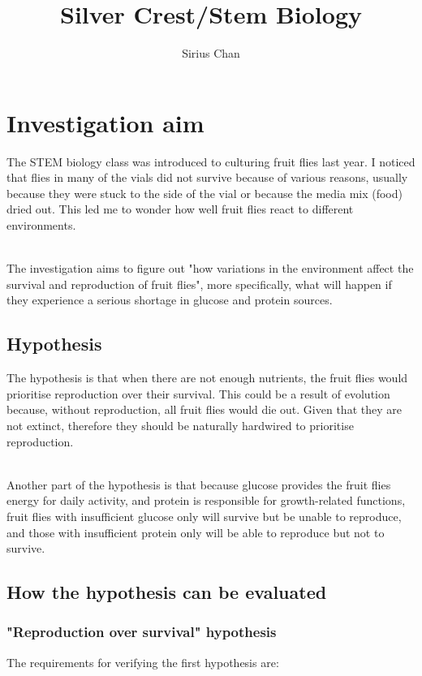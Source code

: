 \documentclass{article}
\title{Silver Crest/Stem Biology}
\author{Sirius Chan}
\begin{document}
\maketitle

\newpage

\section{Investigation aim}

The STEM biology class was introduced to culturing fruit flies last year. I noticed that flies in many of the vials did not survive because of various reasons, usually because they were stuck to the side of the vial or because the media mix (food) dried out. This led me to wonder how well fruit flies react to different environments.

\noindent\\
The investigation aims to figure out "how variations in the environment affect the survival and reproduction of fruit flies", more specifically, what will happen if they experience a serious shortage in glucose and protein sources.

\subsection{Hypothesis}

The hypothesis is that when there are not enough nutrients, the fruit flies would prioritise reproduction over their survival. This could be a result of evolution because, without reproduction, all fruit flies would die out. Given that they are not extinct, therefore they should be naturally hardwired to prioritise reproduction.

\noindent\\
Another part of the hypothesis is that because glucose provides the fruit flies energy for daily activity, and protein is responsible for growth-related functions, fruit flies with insufficient glucose only will survive but be unable to reproduce, and those with insufficient protein only will be able to reproduce but not to survive.

\subsection{How the hypothesis can be evaluated}

\subsubsection{"Reproduction over survival" hypothesis}
The requirements for verifying the first hypothesis are:
\end{document}
